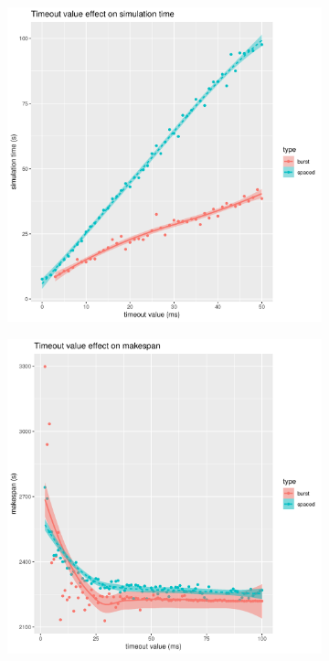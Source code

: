 \begin{figure}
	\begin{subfigure}{.5\textwidth}
		\centering
		\includegraphics[width=\linewidth]{imgs/timeout_duration.png}
		\caption{}
		\label{fig:timeout_duration}
	\end{subfigure}
	\begin{subfigure}{.5\textwidth}
		\centering
		\includegraphics[width=\linewidth]{imgs/timeout_makespan.png}
		\caption{}
		\label{fig:timeout_makespan}
	\end{subfigure}


\end{figure}
